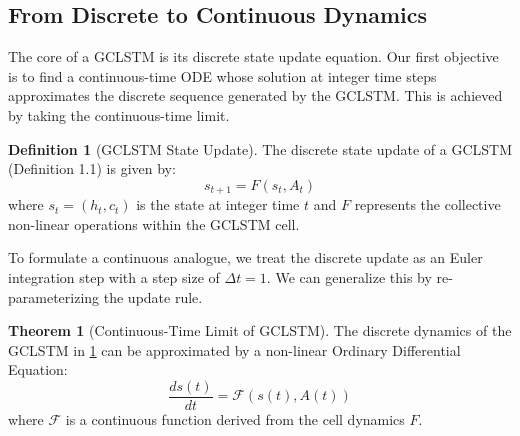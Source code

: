 \documentclass{article}
\theoremstyle{remark}
\theoremstyle{definition}
\newtheorem{definition}{Definition}
\newtheorem{theorem}{Theorem}[section]
\newcommand{\dpt}[1]{\frac{d#1}{dt}} %
\begin{document}
\subsection{From Discrete to Continuous Dynamics} \label{seq:step1}

The core of a GCLSTM is its discrete state update equation. Our first objective is to find a continuous-time ODE whose solution at integer time steps approximates the discrete sequence generated by the GCLSTM. This is achieved by taking the continuous-time limit.

\begin{definition}[GCLSTM State Update]
The discrete state update of a GCLSTM (Definition 1.1) is given by:
\begin{equation}
    s_{t+1} = F(s_t, A_t)
\end{equation} \label{eq:state_update}
where $s_t = (h_t, c_t)$ is the state at integer time $t$ and $F$ represents the collective non-linear operations within the GCLSTM cell.
\end{definition}

To formulate a continuous analogue, we treat the discrete update as an Euler integration step with a step size of $\Delta t = 1$. We can generalize this by re-parameterizing the update rule.


\begin{theorem}[Continuous-Time Limit of GCLSTM]
The discrete dynamics of the GCLSTM in \ref{eq:state_update} can be approximated by a non-linear Ordinary Differential Equation:
\begin{equation}
    \dpt{s(t)} = \mathcal{F}(s(t), A(t))
\end{equation}
where $\mathcal{F}$ is a continuous function derived from the cell dynamics $F$.
\end{theorem}\label{eq:ode_solution_rnn}
\end{document}
